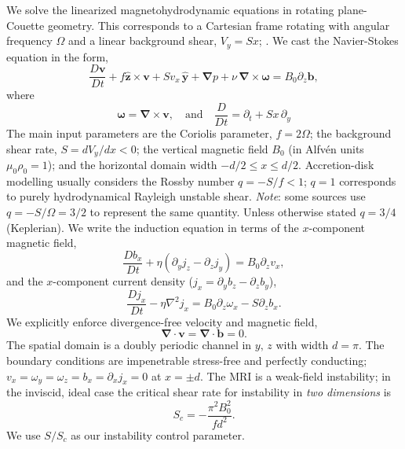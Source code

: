 \documentclass[aps,prl,reprint,superscriptaddress]{revtex4-1}
\newcommand{\SSC}{S/S_{c}}
\begin{document}
We solve the linearized magnetohydrodynamic equations in rotating plane-Couette geometry.
This corresponds to a Cartesian frame rotating with angular frequency $\Omega$ and a linear background shear, $V_{y}=Sx$; \citep[see][]{2015RSPSA.47140699V}.
We cast the Navier-Stokes equation in the form,
\begin{equation}\label{eq:mhd}
\frac{D \boldsymbol{v}}{Dt}+f \boldsymbol{\hat{z}}\times\boldsymbol{v}+{S}v_{x}\,\boldsymbol{\hat{y}}+\boldsymbol{\nabla}{p}+\nu\,\boldsymbol{\nabla}\times\boldsymbol{\omega}=B_{0}\partial_{z}\boldsymbol{b},
\end{equation}
where
\begin{equation}
\boldsymbol{\omega}=\boldsymbol{\nabla}\times\boldsymbol{v},\quad\text{and}\quad\frac{D}{Dt}=\partial_{t}+{S}x\,\partial_{y}\end{equation}
The main input parameters are the Coriolis parameter, $f=2 \Omega$; the background shear rate, $S=dV_{y}/dx<0$;  the vertical magnetic field $B_{0}$ (in Alfv\'{e}n units $\mu_{0}\rho_{0}=1$); and the horizontal domain width $-d/2\le{x}\le d/2$.
Accretion-disk modelling usually considers the Rossby number $q=-S/f<1$; $q=1$ corresponds to purely hydrodynamical Rayleigh unstable shear.
\textit{Note}: some sources use $q=-S/\Omega=3/2$ to represent the same quantity. 
Unless otherwise stated $q=3/4$ (Keplerian).
We write the induction equation in terms of the $x$-component magnetic field,
\begin{equation}\label{eq:Bx}
\frac{Db_{x}}{Dt}+\eta(\partial_{y}j_{z}-\partial_{z}j_{y})=B_{0}\partial_{z}v_{x},
\end{equation}
and the $x$-component current density ($j_{x}=\partial_{y}b_{z}-\partial_{z}b_{y}$),
\begin{equation}\label{eq:Jx}
\frac{Dj_{x}}{Dt}-\eta\nabla^{2}j_{x}=B_{0}\partial_{z}\omega_{x}-S\partial_{z}b_{x}.
\end{equation}
We explicitly enforce divergence-free velocity and magnetic field,
\begin{equation}\label{eq:divu}
 \boldsymbol{\nabla}\cdot\boldsymbol{v}=\boldsymbol{\nabla}\cdot\boldsymbol{b}=0.
\end{equation}
The spatial domain is a doubly periodic channel in $y,\,z$ with width $d=\pi$. 
The boundary conditions are impenetrable stress-free and perfectly conducting; $v_{x}=\omega_{y}=\omega_{z}=b_{x}=\partial_{x}j_{x}=0$ at $x=\pm{d}$. 
The MRI is a weak-field instability; in the inviscid, ideal case the critical shear rate for instability in \textit{two dimensions} is
\begin{equation}\label{eq:Sc}
  S_{c}=-\frac{\pi^{2}B_{0}^2}{fd^2}.
\end{equation}
We use $\SSC$ as our instability control parameter. 
\end{document}
